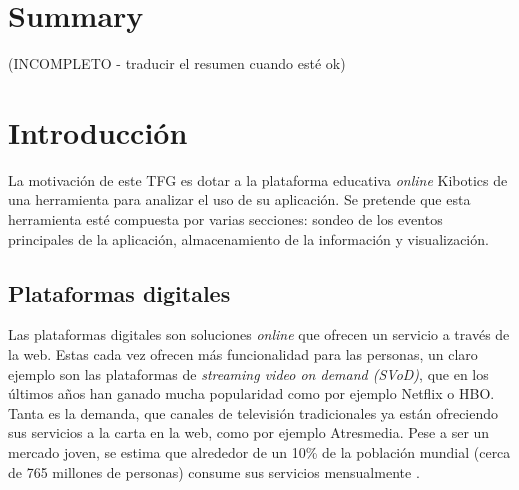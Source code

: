 \documentclass[a4paper, 12pt]{book}
\begin{document}
	\chapter*{Summary}
	
		(INCOMPLETO - traducir el resumen cuando esté ok)
	
	

	\tableofcontents 

	\cleardoublepage
	
	\listoffigures 
		
	\cleardoublepage
	\chapter{Introducción}
	\label{chap:introduccion} 
	
	
		La motivación de este TFG es dotar a la plataforma educativa \textit{online} Kibotics de una herramienta para analizar el uso de su aplicación. Se pretende que esta herramienta esté compuesta por varias secciones: sondeo de los eventos principales de la aplicación, almacenamiento de la información y visualización.
		
	\section{Plataformas digitales}
	\label{sec:plataformas_digitales}
		
		
	
		Las plataformas digitales son soluciones \textit{online} que ofrecen un servicio a través de la web. Estas cada vez ofrecen más funcionalidad para las personas, un claro ejemplo son las plataformas de \textit{streaming video on demand (SVoD)}, que en los últimos años han ganado mucha popularidad como por ejemplo Netflix o HBO. Tanta es la demanda, que canales de televisión tradicionales ya están ofreciendo sus servicios a la carta en la web, como por ejemplo Atresmedia. Pese a ser un mercado joven, se estima que alrededor de un 10\% de la población mundial (cerca de 765 millones de personas) consume sus servicios mensualmente \cite{SVod}.\\
		
\end{document}

